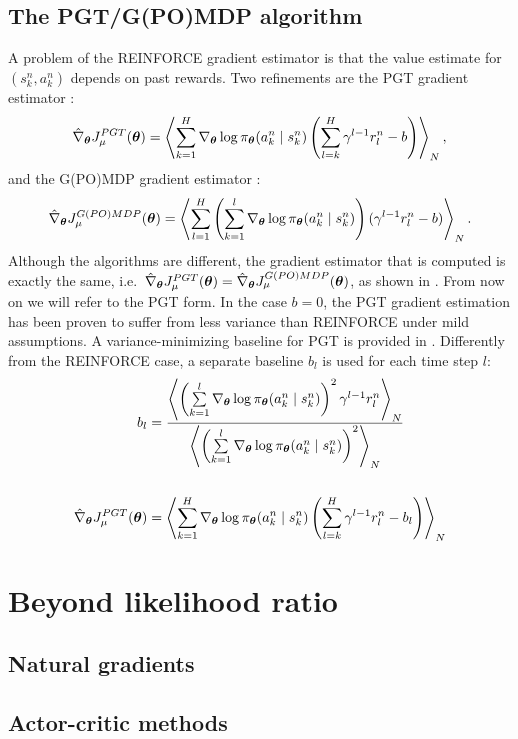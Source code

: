 \subsection{The PGT/G(PO)MDP algorithm}
A problem of the REINFORCE gradient estimator is that the value estimate for $(s_k^n,a_k^n)$ depends on past rewards. Two refinements are the PGT gradient estimator \cite{Sutton2000policy}:
\[
	\hat{\nabla}_{\boldsymbol{\theta}}J_{\mu}^{PGT}(\boldsymbol{\theta}) = 
		\left\langle
		\sum\limits_{k=1}^H\nabla_{\boldsymbol{\theta}}\log\pi_{\boldsymbol{\theta}}(a_k^n \mid s_k^n)
		\left(\sum\limits_{l=k}^H\gamma^{l-1}r_l^n-b\right)\right\rangle_N,
\]
and the G(PO)MDP gradient estimator \cite{Baxter2001infinite}:
\[
	\hat{\nabla}_{\boldsymbol{\theta}}J_{\mu}^{G(PO)MDP}(\boldsymbol{\theta}) = 
			\left\langle
			\sum\limits_{l=1}^H\left(\sum\limits_{k=1}^l
			\nabla_{\boldsymbol{\theta}}\log\pi_{\boldsymbol{\theta}}(a_k^n \mid s_k^n)\right)
			(\gamma^{l-1}r_l^n-b)\right\rangle_N.
\]
Although the algorithms are different, the gradient estimator that is computed is exactly the same, i.e.\ $\hat{\nabla}_{\boldsymbol{\theta}}J_{\mu}^{PGT}(\boldsymbol{\theta}) = \hat{\nabla}_{\boldsymbol{\theta}}J_{\mu}^{G(PO)MDP}(\boldsymbol{\theta})$, as shown in \cite{Peters2008reinf}. From now on we will refer to the PGT form.
In the case $b=0$, the PGT gradient estimation has been proven to suffer from less variance than REINFORCE \cite{Zhao2011a} under mild assumptions. A variance-minimizing baseline for PGT is provided in \cite{Peters2008reinf}. Differently from the REINFORCE case, a separate baseline $b_l$ is used for each time step $l$:
\begin{align*}
	b_l &= \frac{\left\langle\left(\sum\limits_{k=1}^l\nabla_{\boldsymbol{\theta}}\log\pi_{\boldsymbol{\theta}}(a_k^n \mid s_k^n)\right)^2
		\gamma^{l-1}r_l^n\right\rangle_N}
		{\left\langle\left(\sum\limits_{k=1}^l\nabla_{\boldsymbol{\theta}}\log\pi_{\boldsymbol{\theta}}(a_k^n \mid s_k^n)\right)^2
		\right\rangle_N} \\\\
	\hat{\nabla}_{\boldsymbol{\theta}}J_{\mu}^{PGT}(\boldsymbol{\theta}) &= 
		\left\langle
		\sum\limits_{k=1}^H\nabla_{\boldsymbol{\theta}}\log\pi_{\boldsymbol{\theta}}(a_k^n \mid s_k^n)			\left(\sum\limits_{l=k}^H\gamma^{l-1}r_l^n-b_l\right)\right\rangle_N	
\end{align*}

\section{Beyond likelihood ratio}
\subsection{Natural gradients}
\subsection{Actor-critic methods}

